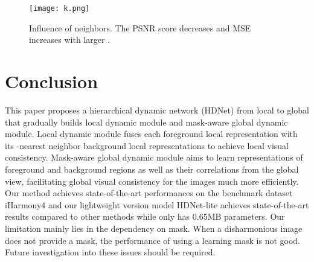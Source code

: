 \documentclass[sigconf]{acmart}
\begin{document}
\begin{figure}[t]
	\centering
	\texttt{[image: k.png]}
	\caption{Influence of neighbors. The PSNR score decreases and MSE increases with larger .}
	\label{k}
\end{figure}







\section{Conclusion}
This paper proposes a hierarchical dynamic network (HDNet) from local to global that gradually builds local dynamic module and mask-aware global dynamic module. Local dynamic module fuses each foreground local representation with its -nearest neighbor background local representations to achieve local visual consistency. Mask-aware global dynamic module aims to learn representations of foreground and background regions as well as their correlations from the global view, facilitating global visual consistency for the images much more efficiently. Our method achieves state-of-the-art performances on the benchmark dataset iHarmony4 and our lightweight version model HDNet-lite achieves state-of-the-art results compared to other methods while only has 0.65MB parameters. Our limitation mainly lies in
the dependency on mask. When a disharmonious image does not provide a mask, the performance of using a learning mask is not good. Future investigation into these issues should be required.





\end{document}
